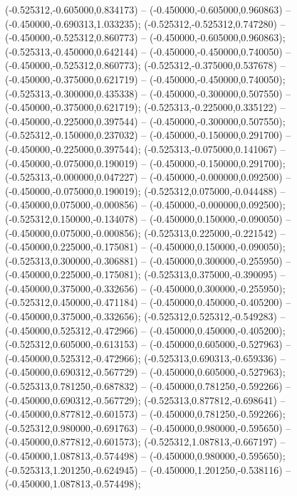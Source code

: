  (-0.525312,-0.605000,0.834173) -- (-0.450000,-0.605000,0.960863) -- (-0.450000,-0.690313,1.033235);
 (-0.525312,-0.525312,0.747280) -- (-0.450000,-0.525312,0.860773) -- (-0.450000,-0.605000,0.960863);
 (-0.525313,-0.450000,0.642144) -- (-0.450000,-0.450000,0.740050) -- (-0.450000,-0.525312,0.860773);
 (-0.525312,-0.375000,0.537678) -- (-0.450000,-0.375000,0.621719) -- (-0.450000,-0.450000,0.740050);
 (-0.525313,-0.300000,0.435338) -- (-0.450000,-0.300000,0.507550) -- (-0.450000,-0.375000,0.621719);
 (-0.525313,-0.225000,0.335122) -- (-0.450000,-0.225000,0.397544) -- (-0.450000,-0.300000,0.507550);
 (-0.525312,-0.150000,0.237032) -- (-0.450000,-0.150000,0.291700) -- (-0.450000,-0.225000,0.397544);
 (-0.525313,-0.075000,0.141067) -- (-0.450000,-0.075000,0.190019) -- (-0.450000,-0.150000,0.291700);
 (-0.525313,-0.000000,0.047227) -- (-0.450000,-0.000000,0.092500) -- (-0.450000,-0.075000,0.190019);
 (-0.525312,0.075000,-0.044488) -- (-0.450000,0.075000,-0.000856) -- (-0.450000,-0.000000,0.092500);
 (-0.525312,0.150000,-0.134078) -- (-0.450000,0.150000,-0.090050) -- (-0.450000,0.075000,-0.000856);
 (-0.525313,0.225000,-0.221542) -- (-0.450000,0.225000,-0.175081) -- (-0.450000,0.150000,-0.090050);
 (-0.525313,0.300000,-0.306881) -- (-0.450000,0.300000,-0.255950) -- (-0.450000,0.225000,-0.175081);
 (-0.525313,0.375000,-0.390095) -- (-0.450000,0.375000,-0.332656) -- (-0.450000,0.300000,-0.255950);
 (-0.525312,0.450000,-0.471184) -- (-0.450000,0.450000,-0.405200) -- (-0.450000,0.375000,-0.332656);
 (-0.525312,0.525312,-0.549283) -- (-0.450000,0.525312,-0.472966) -- (-0.450000,0.450000,-0.405200);
 (-0.525312,0.605000,-0.613153) -- (-0.450000,0.605000,-0.527963) -- (-0.450000,0.525312,-0.472966);
 (-0.525313,0.690313,-0.659336) -- (-0.450000,0.690312,-0.567729) -- (-0.450000,0.605000,-0.527963);
 (-0.525313,0.781250,-0.687832) -- (-0.450000,0.781250,-0.592266) -- (-0.450000,0.690312,-0.567729);
 (-0.525313,0.877812,-0.698641) -- (-0.450000,0.877812,-0.601573) -- (-0.450000,0.781250,-0.592266);
 (-0.525312,0.980000,-0.691763) -- (-0.450000,0.980000,-0.595650) -- (-0.450000,0.877812,-0.601573);
 (-0.525312,1.087813,-0.667197) -- (-0.450000,1.087813,-0.574498) -- (-0.450000,0.980000,-0.595650);
 (-0.525313,1.201250,-0.624945) -- (-0.450000,1.201250,-0.538116) -- (-0.450000,1.087813,-0.574498);
